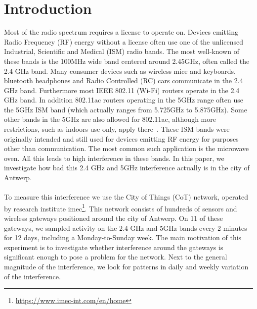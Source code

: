 \documentclass[a4paper, 11pt]{article}
\begin{document}
\section{Introduction}
Most of the radio spectrum requires a license to operate on. Devices emitting Radio Frequency (RF) energy without a license often use one of the unlicensed Industrial, Scientific and Medical (ISM) radio bands. The most well-known of these bands is the 100MHz wide band centered around 2.45GHz, often called the 2.4 GHz band. Many consumer devices such as wireless mice and keyboards, bluetooth headphones and Radio Controlled (RC) cars communicate in the 2.4 GHz band. Furthermore most IEEE 802.11 (Wi-Fi) routers operate in the 2.4 GHz band. In addition 802.11ac routers operating in the 5GHz range often use the 5GHz ISM band (which actually ranges from 5.725GHz to 5.875GHz). Some other bands in the 5GHz are also allowed for 802.11ac, although more restrictions, such as indoors-use only, apply there~\cite{50ism}. These ISM bands were originally intended and still used for devices emitting RF energy for purposes other than communication. The most common such application is the microwave oven. All this leads to high interference in these bands. In this paper, we investigate how bad this 2.4 GHz and 5GHz interference actually is in the city of Antwerp. \\ \\
To measure this interference we use the City of Things (CoT) network, operated by research institute imec\footnote{\url{https://www.imec-int.com/en/home}}. This network consists of hundreds of sensors and wireless gateways positioned around the city of Antwerp. On 11 of these gateways, we sampled activity on the 2.4 GHz and 5GHz bands every 2 minutes for 12 days, including a Monday-to-Sunday week. The main motivation of this experiment is to investigate whether interference around the gateways is significant enough to pose a problem for the network. Next to the general magnitude of the interference, we look for patterns in daily and weekly variation of the interference.
\end{document}
